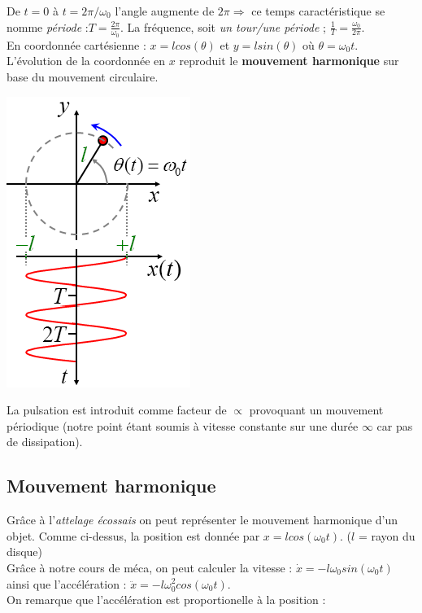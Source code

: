 \documentclass	[11pt, a4paper, openany]{book}
\begin{document}
De $t = 0$ à $t = 2\pi/\omega_0$ l'angle augmente de $2\pi \Rightarrow$ ce temps caractéristique se nomme \textit{période} :$T = \frac{2\pi}{\omega_0}$. La fréquence, soit \textit{un tour/une période} ; $\frac{1}{T} = \frac{\omega_0}{2\pi}$.\\

En coordonnée cartésienne : $x = l cos(\theta)$ et $y = l sin(\theta)$ où $\theta = \omega_0 t$. L'évolution de la coordonnée en $x$ reproduit le \textbf{mouvement harmonique} sur base du mouvement circulaire.

\begin{center}
\includegraphics[scale=0.35]{oo/image0.png}
\end{center}
La pulsation est introduit comme facteur de $\propto$ provoquant un mouvement périodique (notre point étant soumis à vitesse constante sur une durée $\infty$ car pas de dissipation).
\subsection{Mouvement harmonique}
Grâce à l'\textit{attelage écossais} on peut représenter le mouvement harmonique d'un objet. Comme ci-dessus, la position est donnée par $x = l cos(\omega_0 t)$. ($l$ = rayon du disque)\\
Grâce à notre cours de méca, on peut calculer la vitesse : $\dot{x} = -l \omega_0 sin(\omega_0 t)$ ainsi que l'accélération : $\ddot{x} = -l \omega_0^2 cos(\omega_0 t)$. \\
On remarque que l'accélération est proportionelle à la position : 
\end{document}
